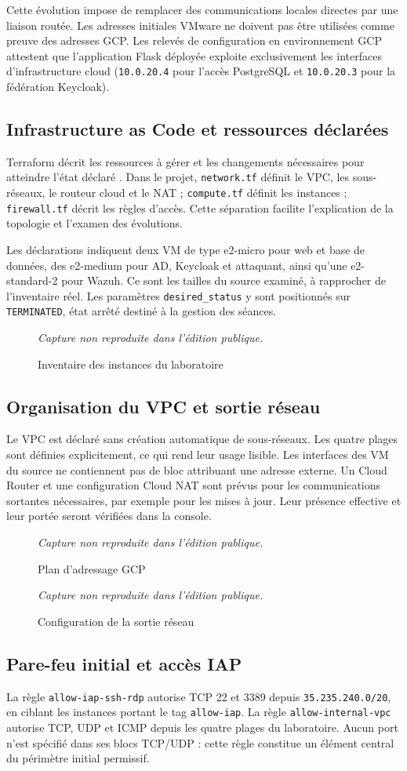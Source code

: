 \documentclass[a4paper,12pt]{report}
\newcommand{\publiccapture}[1]{%
  \begin{figure}[H]\centering
  {\footnotesize\itshape Capture non reproduite dans l'édition publique.}
  \caption{#1}\end{figure}}
\begin{document}
Cette évolution impose de remplacer des communications locales directes par une liaison routée. Les adresses initiales VMware ne doivent pas être utilisées comme preuve des adresses GCP. Les relevés de configuration en environnement GCP attestent que l'application Flask déployée exploite exclusivement les interfaces d'infrastructure cloud (\texttt{10.0.20.4} pour l'accès PostgreSQL et \texttt{10.0.20.3} pour la fédération Keycloak).

\subsection{Infrastructure as Code et ressources déclarées}
Terraform décrit les ressources à gérer et les changements nécessaires pour atteindre l'état déclaré \cite{terraform}. Dans le projet, \texttt{network.tf} définit le VPC, les sous-réseaux, le routeur cloud et le NAT ; \texttt{compute.tf} définit les instances ; \texttt{firewall.tf} décrit les règles d'accès. Cette séparation facilite l'explication de la topologie et l'examen des évolutions.

Les déclarations indiquent deux VM de type e2-micro pour web et base de données, des e2-medium pour AD, Keycloak et attaquant, ainsi qu'une e2-standard-2 pour Wazuh. Ce sont les tailles du source examiné, à rapprocher de l'inventaire réel. Les paramètres \texttt{desired\_status} y sont positionnés sur \texttt{TERMINATED}, état arrêté destiné à la gestion des séances.
\publiccapture{Inventaire des instances du laboratoire}

\subsection{Organisation du VPC et sortie réseau}
Le VPC est déclaré sans création automatique de sous-réseaux. Les quatre plages sont définies explicitement, ce qui rend leur usage lisible. Les interfaces des VM du source ne contiennent pas de bloc attribuant une adresse externe. Un Cloud Router et une configuration Cloud NAT sont prévus pour les communications sortantes nécessaires, par exemple pour les mises à jour. Leur présence effective et leur portée seront vérifiées dans la console.
\publiccapture{Plan d'adressage GCP}
\publiccapture{Configuration de la sortie réseau}

\subsection{Pare-feu initial et accès IAP}
La règle \texttt{allow-iap-ssh-rdp} autorise TCP 22 et 3389 depuis \texttt{35.235.240.0/20}, en ciblant les instances portant le tag \texttt{allow-iap}. La règle \texttt{allow-internal-vpc} autorise TCP, UDP et ICMP depuis les quatre plages du laboratoire. Aucun port n'est spécifié dans ses blocs TCP/UDP : cette règle constitue un élément central du périmètre initial permissif.
\end{document}
